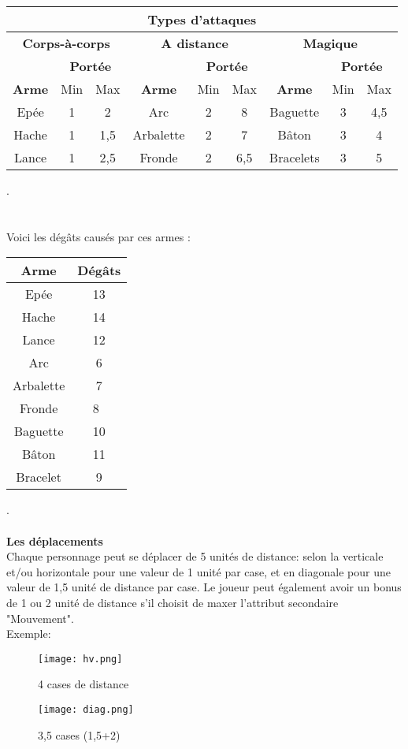 \documentclass[a4paper,12pt]{report}
\begin{document}
	\begin{tabular}{|c|c|c|c|c|c|c|c|c|}
		\hline
		\multicolumn{9}{|c|}{Types d'attaques} \\
		\hline 
		\multicolumn{3}{|c|}{ \textbf{Corps-à-corps}} & 
		\multicolumn{3}{|c|}{ \textbf{A distance}}  & \multicolumn{3}{|c|}{\textbf{Magique}}\\
		\hline
		& \multicolumn{2}{|c|}{\textbf{Portée}} & & \multicolumn{2}{|c|}{\textbf{Portée}} & & \multicolumn{2}{|c|}{\textbf{Portée}} \\
		\hline
		\textbf{Arme} & Min & Max & \textbf{Arme}& Min & Max & \textbf{Arme}& Min & Max\\
		\hline 
		Epée & 1 & 2 & Arc & 2 & 8 & Baguette & 3 & 4,5 \\
		\hline
		Hache & 1 & 1,5 & Arbalette & 2 & 7 & Bâton & 3 & 4\\
		\hline
		Lance & 1 & 2,5 & Fronde & 2 & 6,5 &  Bracelets & 3 & 5 \\
		\hline

	\end{tabular}
	. \\ \\ \\
	Voici les dégâts causés par ces armes : \\ 
	\begin{center}
		\begin{tabular}{|c|c|}
			
			\hline
			Arme & Dégâts \\
			\hline
			Epée & 13 \\
			Hache & 14\\
			Lance & 12\\
			Arc & 6\\
			Arbalette & 7 \\
			Fronde & 8 \\
			Baguette & 10 \\
			Bâton & 11 \\
			Bracelet & 9 \\
			\hline
		\end{tabular}
	\end{center}
	.\\ \\
	\textbf{Les déplacements}\\
	
	Chaque personnage peut se déplacer de 5 unités de distance: selon la verticale et/ou horizontale pour une valeur de 1 unité par case, et en diagonale pour une valeur de 1,5 unité de distance par case. Le joueur peut également avoir un bonus de 1 ou 2 unité de distance s'il choisit de maxer l'attribut secondaire "Mouvement".\\ Exemple:
	\begin{figure*}[h]
		\centering
		\begin{subfigure}[b]{0.4\linewidth}
			\centering
			\texttt{[image: hv.png]}
			\caption{4 cases de distance} 
		\end{subfigure}
		\begin{subfigure}[b]{0.4\linewidth}
			\centering
			\texttt{[image: diag.png]}
			\caption{3,5 cases (1,5+2)}
		\end{subfigure}
	\end{figure*}
	
\end{document}
